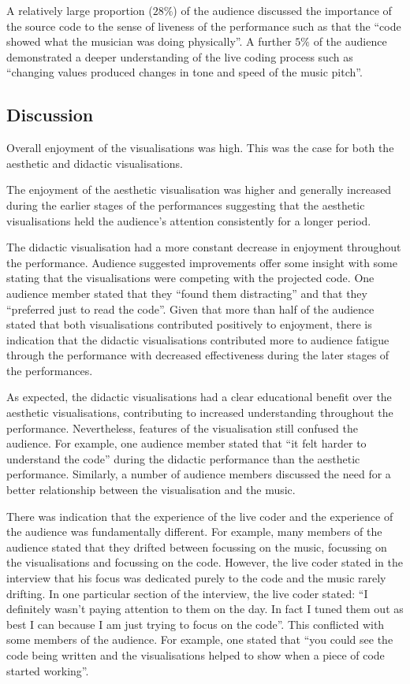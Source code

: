 \documentclass{sig-alternate}
\begin{document}
A relatively large proportion ($28\%$) of the audience discussed the importance of the source code to the sense of liveness of the performance such as that the ``code showed what the musician was doing physically''. A further $5\%$ of the audience demonstrated a deeper understanding of the live coding process such as ``changing values produced changes in tone and speed of the music pitch''.

\subsection{Discussion}

Overall enjoyment of the visualisations was high. This was the case for both the aesthetic and didactic visualisations.

The enjoyment of the aesthetic visualisation was higher and generally increased during the earlier stages of the performances suggesting that the aesthetic visualisations held the audience's attention consistently for a longer period.

The didactic visualisation had a more constant decrease in enjoyment throughout the performance. Audience suggested improvements offer some insight with some stating that the visualisations were competing with the projected code. One audience member stated that they ``found them distracting'' and that they ``preferred just to read the code''. Given that more than half of the audience stated that both visualisations contributed positively to enjoyment, there is indication that the didactic visualisations contributed more to audience fatigue through the performance with decreased effectiveness during the later stages of the performances.

As expected, the didactic visualisations had a clear educational benefit over the aesthetic visualisations, contributing to increased understanding throughout the performance. Nevertheless, features of the visualisation still confused the audience. For example, one audience member stated that ``it felt harder to understand the code'' during the didactic performance than the aesthetic performance. Similarly, a number of audience members discussed the need for a better relationship between the visualisation and the music.

There was indication that the experience of the live coder and the experience of the audience was fundamentally different. For example, many members of the audience stated that they drifted between focussing on the music, focussing on the visualisations and focussing on the code. However, the live coder stated in the interview that his focus was dedicated purely to the code and the music rarely drifting. In one particular section of the interview, the live coder stated: ``I definitely wasn't paying attention to them on the day. In fact I tuned them out as best I can because I am just trying to focus on the code''. This conflicted with some members of the audience. For example, one stated that ``you could see the code being written and the visualisations helped to show when a piece of code started working''. 
\end{document}
